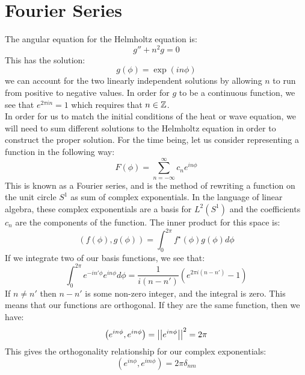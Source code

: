 \documentclass{paper}
\begin{document}
\section{Fourier Series}
The angular equation for the Helmholtz equation is:
\begin{equation}
  g''+n^2 g=0
\end{equation}
This has the solution:
\begin{equation}
  g(\phi) = \exp(i n \phi)
\end{equation}
we can account for the two linearly independent solutions by allowing $n$ to run from positive to negative values. In order for $g$ to be a continuous function, we see that $e^{2\pi i n} = 1$ which requires that $n\in\mathbb{Z}$.\\
In order for us to match the initial conditions of the heat or wave equation, we will need to sum different solutions to the Helmholtz equation in order to construct the proper solution. For the time being, let us consider representing a function in the following way:
\begin{equation}
  F(\phi) = \sum_{n = -\infty}^\infty c_n e^{in\phi}
\end{equation}
This is known as a Fourier series, and is the method of rewriting a function on the unit circle $S^1$ as sum of complex exponentials. In the language of linear algebra, these complex exponentials are a basis for $L^2(S^1)$ and the coefficients $c_n$ are the components of the function. The inner product for this space is:
\begin{equation}
  (f(\phi),g(\phi)) = \int_0^{2\pi} f^\star(\phi)g(\phi) d\phi
\end{equation}
If we integrate two of our basis functions, we see that:
\begin{equation}
  \int_0^{2\pi} e^{-i n' \phi} e^{i n \phi} d\phi = \frac{1}{i(n-n')}\left(e^{2\pi i (n-n')} - 1\right)
\end{equation}
If $n\neq n'$ then $n-n'$ is some non-zero integer, and the integral is zero. This means that our functions are orthogonal. If they are the same function, then we have:
\begin{equation}
  \left(e^{in\phi}, e^{i n\phi} \right) = \left|\left| e^{in\phi} \right|\right|^2 = 2\pi
\end{equation}
This gives the orthogonality relationship for our complex exponentials:
\begin{equation}
  \boxed{
  \left(e^{in\phi}, e^{i m\phi} \right) = 2\pi \delta_{nm}
  }
\end{equation}
\end{document}
